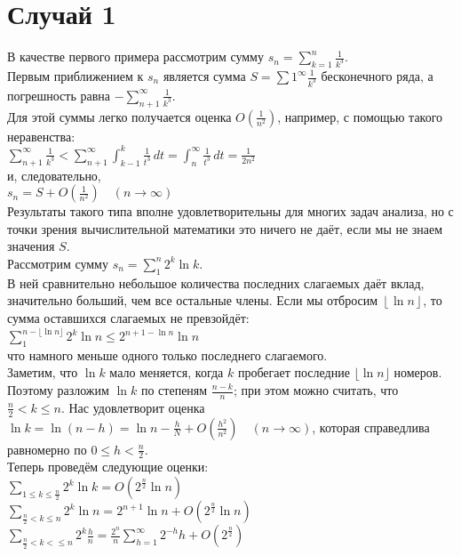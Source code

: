 \documentclass{report}
\begin{document}
\section{Случай 1}
В качестве первого примера рассмотрим сумму $s_n=\sum_{k=1}^{n}\frac{1}{k^{3}}$. \\
Первым приближением к $s_n$ является сумма $S=\sum{1}^{\infty}\frac{1}{k^{3}}$ бесконечного ряда, а погрешность равна $-\sum_{n+1}^{\infty}\frac{1}{k^{3}}$. \\
Для этой суммы легко получается оценка $O(\frac{1}{n^{2}})$, например, с помощью такого неравенства: \\
$\sum_{n+1}^{\infty}\frac{1}{k^{3}}<\sum_{n+1}^{\infty}\int_{k-1}^{k}\frac{1}{t^{3}}\,dt=\int_{n}^{\infty}\frac{1}{t^{3}}\,dt=\frac{1}{2n^{2}}$ \\
и, следовательно, \\
$s_n=S+O\left(\frac{1}{n^{2}}\right)\quad(n\to\infty)$ \\
Результаты такого типа вполне удовлетворительны для многих задач анализа, но с точки зрения вычислительной математики это ничего не даёт, если мы не знаем значения $S$. \\
Рассмотрим сумму $s_n=\sum_{1}^{n}2^{k}\ln{k}$. \\
В ней сравнительно небольшое количества последних слагаемых даёт вклад, значительно больший, чем все остальные члены. Если мы отбросим $\left\lfloor\ln{n}\right\rfloor$, то сумма
оставшихся слагаемых не превзойдёт: \\
$\sum_{1}^{n-\lfloor\ln{n}\rfloor}2^{k}\ln{n}\le 2^{n+1-\ln{n}}\ln{n}$ \\
что намного меньше одного только последнего слагаемого. \\
Заметим, что $\ln{k}$ мало меняется, когда $k$ пробегает последние $\lfloor{\ln{n}}\rfloor$ номеров. Поэтому разложим $\ln{k}$ по степеням $\frac{n-k}{n}$; при этом можно считать, что
$\frac{n}{2}<k\le{n}$. Нас удовлетворит оценка \\
$\ln{k}=\ln(n-h)=\ln{n}-\frac{h}{N}+O\left(\frac{h^{2}}{n^{2}}\right)\quad(n\to\infty)$, которая справедлива равномерно по $0\le{h}<\frac{n}{2}$. \\
Теперь проведём следующие оценки: \\
$\sum_{1\le{k}\le\frac{n}{2}}2^{k}\ln{k}=O\left(2^{\frac{n}{2}}\ln{n}\right)$ \\
$\sum_{\frac{n}{2}<k\le{n}}2^{k}\ln{n}=2^{n+1}\ln{n}+O(2^{\frac{n}{2}}\ln{n})$ \\
$\sum_{\frac{n}{2}<k<\le{n}}2^{k}\frac{h}{n}=\frac{2^{n}}{n}\sum_{h=1}^{\infty}2^{-h}h+O\left(2^{\frac{n}{2}}\right)$\\
\end{document}
